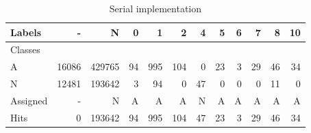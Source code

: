 
\begin{table}[hbt]%
{\scriptsize
\setlength\tabcolsep{0.5em}
\begin{center}
\caption{Serial implementation}
\label{tab:libc-matrix}
\begin{tabular}{l|r|r|r|r|r|r|r|r|r|r|r}
  Labels &      - &       N &   0 &    1 &    2 &   4 &   5 &  6 &   7 &   8 &  10 \\\hline
  Classes  &        &         &     &      &      &     &     &    &     &     &     \\\hline
  \hline
  A        &  16086 &  429765 &  94 &  995 &  104 &   0 &  23 &  3 &  29 &  46 &  34 \\\hline
  N        &  12481 &  193642 &   3 &   94 &    0 &  47 &   0 &  0 &   0 &  11 &   0 \\\hline
  \hline
  Assigned &      - &       N &   A &    A &    A &   N &   A &  A &   A &   A &   A \\\hline
  Hits     &      0 &  193642 &  94 &  995 &  104 &  47 &  23 &  3 &  29 &  46 &  34 
\end{tabular}
\end{center}
}
\end{table}

\vspace{3ex}

